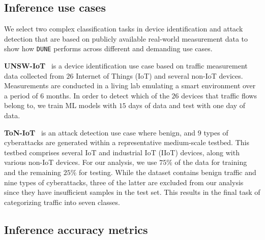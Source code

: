 \documentclass[journal]{IEEEtran}
\theoremstyle{plain} %
\newcommand{\name}{\texttt{\fontsize{9}{11}\selectfont DUNE}\xspace}
\begin{document}
\subsection{Inference use cases}
\label{sub:use-cases}

We select two complex classification tasks in device identification and attack detection that are based on publicly available real-world measurement data to show how \name performs across different and demanding use cases.

\textbf{UNSW-IoT}~\cite{unsw_IoT_traces} is a device identification use case based on traffic measurement data collected from $26$ Internet of Things (IoT) and several non-IoT devices. Measurements are conducted in a living lab emulating a smart environment over a period of $6$ months. In order to detect which of the $26$ devices that traffic flows belong to, we train ML models with $15$ days of data and test with one day of data.


\textbf{ToN-IoT}~\cite{ToN_IoT_Telemetry_dataset} is an attack detection use case where benign, and $9$ types of cyberattacks are generated within a representative medium-scale testbed. This testbed comprises several IoT and industrial IoT (IIoT) devices, along with various non-IoT devices. 
For our analysis, we use $75\%$ of the data for training and the remaining $25\%$ for testing. While the dataset contains benign traffic and nine types of cyberattacks, three of the latter are excluded from our analysis since they have insufficient samples in the test set. This results in the final task of categorizing traffic into seven classes.

\subsection{Inference accuracy metrics}
\label{sub:metrics}
\end{document}
